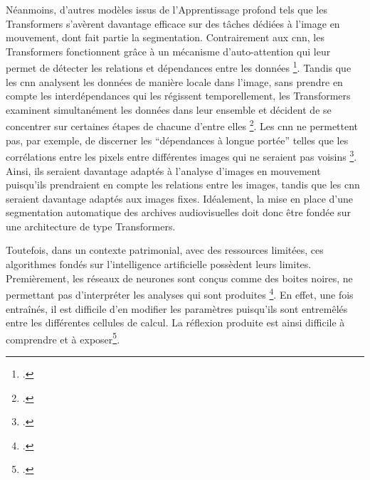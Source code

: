 Néanmoins, d’autres modèles issus de l'\gls{Apprentissage profond} tels que les \gls{Transformers} s’avèrent davantage efficace sur des tâches dédiées à l’image en mouvement, dont fait partie la segmentation. Contrairement aux \gls{cnn}, les \gls{Transformers} fonctionnent grâce à un mécanisme d’auto-attention qui leur permet de détecter les relations et dépendances entre les données \footcite{bergmann2025}. Tandis que les \gls{cnn} analysent les données de manière locale dans l'image, sans prendre en compte les interdépendances qui les régissent temporellement, les \gls{Transformers} examinent simultanément les données dans leur ensemble et décident de se concentrer sur certaines étapes de chacune d'entre elles \footcite{bergmann2025}. Les \gls{cnn} ne permettent pas, par exemple, de discerner les “dépendances à longue portée” telles que les corrélations entre les pixels entre différentes images qui ne seraient pas voisins \footcite{bergmann2025}. Ainsi, ils seraient davantage adaptés à l’analyse d’images en mouvement puisqu’ils prendraient en compte les relations entre les images, tandis que les \gls{cnn} seraient davantage adaptés aux images fixes.  Idéalement, la mise en place d’une segmentation automatique des archives audiovisuelles doit donc être fondée sur une architecture de type \gls{Transformers}.  


Toutefois, dans un contexte patrimonial, avec des ressources limitées, ces algorithmes fondés sur l’intelligence artificielle possèdent leurs limites. Premièrement, les réseaux de neurones sont conçus comme des boites noires, ne permettant pas d’interpréter les analyses qui sont produites \footcite{brachmann2017}. En effet, une fois entraînés, il est difficile d’en modifier les paramètres puisqu’ils sont entremêlés entre les différentes cellules de calcul. La réflexion produite est ainsi difficile à comprendre et à exposer\footcite{mahony2020}. 

